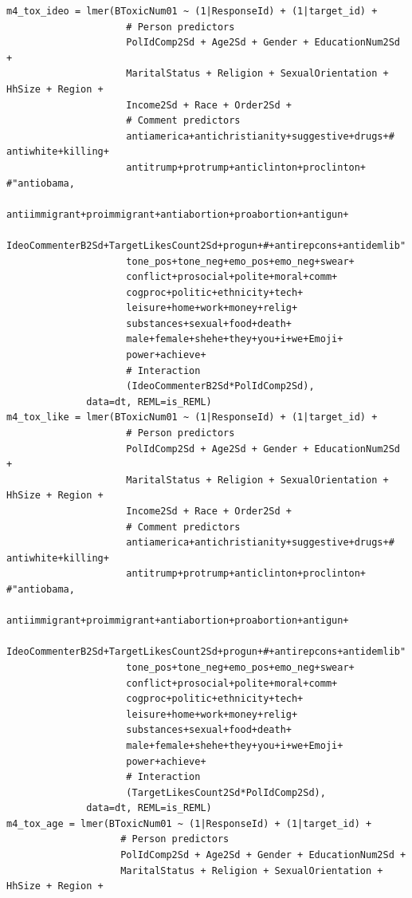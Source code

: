 \documentclass{article}
\begin{document}
\begin{lstlisting}
m4_tox_ideo = lmer(BToxicNum01 ~ (1|ResponseId) + (1|target_id) + 
                     # Person predictors
                     PolIdComp2Sd + Age2Sd + Gender + EducationNum2Sd + 
                     MaritalStatus + Religion + SexualOrientation + HhSize + Region + 
                     Income2Sd + Race + Order2Sd + 
                     # Comment predictors  
                     antiamerica+antichristianity+suggestive+drugs+# antiwhite+killing+
                     antitrump+protrump+anticlinton+proclinton+ #"antiobama,
                     antiimmigrant+proimmigrant+antiabortion+proabortion+antigun+
                     IdeoCommenterB2Sd+TargetLikesCount2Sd+progun+#+antirepcons+antidemlib"
                     tone_pos+tone_neg+emo_pos+emo_neg+swear+
                     conflict+prosocial+polite+moral+comm+
                     cogproc+politic+ethnicity+tech+
                     leisure+home+work+money+relig+  
                     substances+sexual+food+death+    
                     male+female+shehe+they+you+i+we+Emoji+
                     power+achieve+
                     # Interaction
                     (IdeoCommenterB2Sd*PolIdComp2Sd),
              data=dt, REML=is_REML)
m4_tox_like = lmer(BToxicNum01 ~ (1|ResponseId) + (1|target_id) + 
                     # Person predictors
                     PolIdComp2Sd + Age2Sd + Gender + EducationNum2Sd + 
                     MaritalStatus + Religion + SexualOrientation + HhSize + Region + 
                     Income2Sd + Race + Order2Sd + 
                     # Comment predictors  
                     antiamerica+antichristianity+suggestive+drugs+# antiwhite+killing+
                     antitrump+protrump+anticlinton+proclinton+ #"antiobama,
                     antiimmigrant+proimmigrant+antiabortion+proabortion+antigun+
                     IdeoCommenterB2Sd+TargetLikesCount2Sd+progun+#+antirepcons+antidemlib"
                     tone_pos+tone_neg+emo_pos+emo_neg+swear+
                     conflict+prosocial+polite+moral+comm+
                     cogproc+politic+ethnicity+tech+
                     leisure+home+work+money+relig+  
                     substances+sexual+food+death+    
                     male+female+shehe+they+you+i+we+Emoji+
                     power+achieve+
                     # Interaction
                     (TargetLikesCount2Sd*PolIdComp2Sd),
              data=dt, REML=is_REML)
m4_tox_age = lmer(BToxicNum01 ~ (1|ResponseId) + (1|target_id) + 
                    # Person predictors
                    PolIdComp2Sd + Age2Sd + Gender + EducationNum2Sd + 
                    MaritalStatus + Religion + SexualOrientation + HhSize + Region + 

\end{lstlisting}
\end{document}
